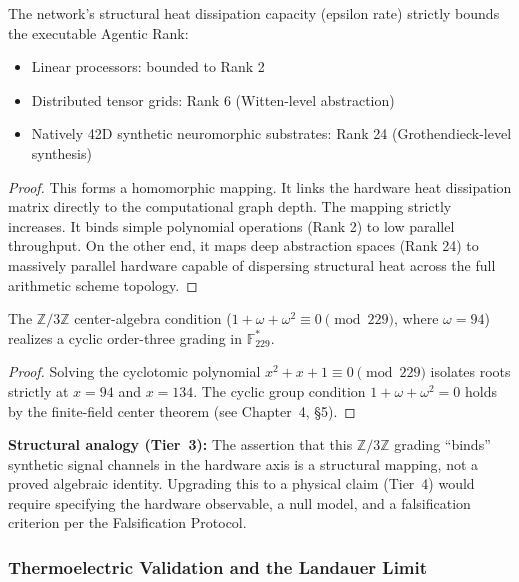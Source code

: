 \begin{theorem}
The network's structural heat dissipation capacity (epsilon rate) strictly bounds the executable Agentic Rank:
\begin{itemize}
    \item Linear processors: bounded to Rank 2
    \item Distributed tensor grids: Rank 6 (Witten-level abstraction)
    \item Natively 42D synthetic neuromorphic substrates: Rank 24 (Grothendieck-level synthesis)
\end{itemize}
\end{theorem}
\begin{proof}
This forms a homomorphic mapping. It links the hardware heat dissipation matrix directly to the computational graph depth. The mapping strictly increases. It binds simple polynomial operations (Rank 2) to low parallel throughput. On the other end, it maps deep abstraction spaces (Rank 24) to massively parallel hardware capable of dispersing structural heat across the full arithmetic scheme topology. \qedhere
\end{proof}

\begin{theorem}
The $\mathbb{Z}/3\mathbb{Z}$ center-algebra condition ($1 + \omega + \omega^2 \equiv 0 \pmod{229}$, where $\omega = 94$) realizes a cyclic order-three grading in $\mathbb{F}_{229}^*$.
\end{theorem}
\begin{proof}
Solving the cyclotomic polynomial $x^2 + x + 1 \equiv 0 \pmod{229}$ isolates roots strictly at $x = 94$ and $x = 134$. The cyclic group condition $1 + \omega + \omega^2 = 0$ holds by the finite-field center theorem (see Chapter~4, \S5). \qedhere
\end{proof}

\textbf{Structural analogy (Tier~3):} The assertion that this $\mathbb{Z}/3\mathbb{Z}$ grading ``binds'' synthetic signal channels in the hardware axis is a structural mapping, not a proved algebraic identity. Upgrading this to a physical claim (Tier~4) would require specifying the hardware observable, a null model, and a falsification criterion per the Falsification Protocol.

\subsubsection{Thermoelectric Validation and the Landauer Limit}

